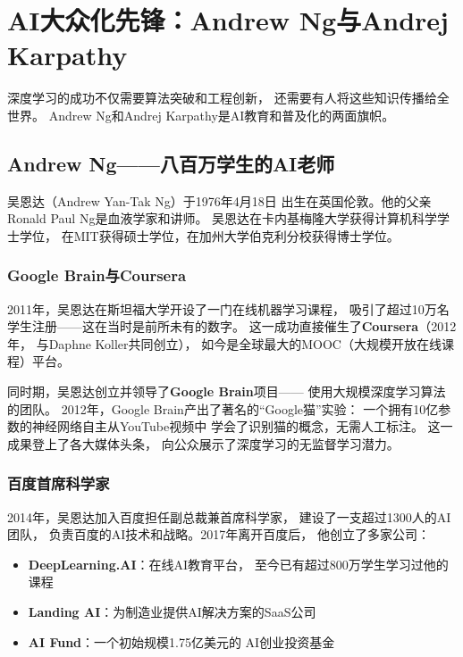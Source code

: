 \section{AI大众化先锋：Andrew Ng与Andrej Karpathy}
\label{sec:popularizers}

深度学习的成功不仅需要算法突破和工程创新，
还需要有人将这些知识传播给全世界。
Andrew Ng和Andrej Karpathy是AI教育和普及化的两面旗帜。

\subsection{Andrew Ng——八百万学生的AI老师}
\label{sec:andrew-ng}

吴恩达（Andrew Yan-Tak Ng）于1976年4月18日
出生在英国伦敦。他的父亲Ronald Paul Ng是血液学家和讲师。
吴恩达在卡内基梅隆大学获得计算机科学学士学位，
在MIT获得硕士学位，在加州大学伯克利分校获得博士学位。

\subsubsection{Google Brain与Coursera}
2011年，吴恩达在斯坦福大学开设了一门在线机器学习课程，
吸引了超过10万名学生注册——这在当时是前所未有的数字。
这一成功直接催生了\textbf{Coursera}（2012年，
与Daphne Koller共同创立），
如今是全球最大的MOOC（大规模开放在线课程）平台。

同时期，吴恩达创立并领导了\textbf{Google Brain}项目——
使用大规模深度学习算法的团队。
2012年，Google Brain产出了著名的``Google猫''实验：
一个拥有10亿参数的神经网络自主从YouTube视频中
学会了识别猫的概念，无需人工标注。
这一成果登上了各大媒体头条，
向公众展示了深度学习的无监督学习潜力。

\subsubsection{百度首席科学家}
2014年，吴恩达加入百度担任副总裁兼首席科学家，
建设了一支超过1300人的AI团队，
负责百度的AI技术和战略。2017年离开百度后，
他创立了多家公司：
\begin{itemize}[noitemsep]
  \item \textbf{DeepLearning.AI}：在线AI教育平台，
    至今已有超过800万学生学习过他的课程
  \item \textbf{Landing AI}：为制造业提供AI解决方案的SaaS公司
  \item \textbf{AI Fund}：一个初始规模1.75亿美元的
    AI创业投资基金
\end{itemize}

